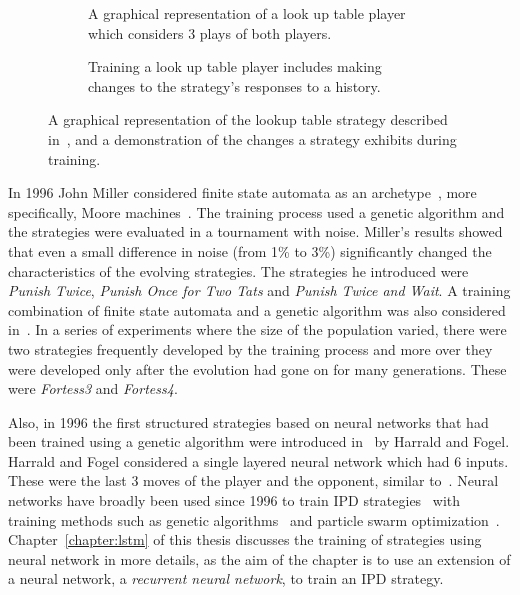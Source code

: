 \begin{figure}[!hbtp]
    \begin{subfigure}{.45\textwidth}\centering
        
        \caption{A graphical representation of a look up table player which considers
        3 plays of both players.}\label{fig:lookup_table_diagram}
    \end{subfigure}\hspace{.5cm}
    \begin{subfigure}{.45\textwidth}\centering
        
        \caption{Training a look up table player includes making changes to the
        strategy's responses to a history.}\label{fig:lookup_table_diagram_choice}
     \end{subfigure}
     \caption{A graphical representation of the lookup table strategy described
     in~\cite{Axelrod1987}, and a demonstration of the changes a strategy exhibits
     during training.}\label{fig:lookup_table}
\end{figure}

In 1996 John Miller considered finite state automata as an
archetype~\cite{Miller1996}, more specifically, Moore
machines~\cite{moore1956}. The training process used a genetic algorithm and
the strategies were evaluated in a tournament with noise.
Miller's results showed that even a small
difference in noise (from 1\% to 3\%) significantly changed the characteristics
of the evolving strategies. The strategies he introduced were \textit{Punish
Twice}, \textit{Punish Once for Two Tats} and \textit{Punish Twice and Wait}.
A training combination of finite state automata and a genetic algorithm was
also considered in~\cite{Ashlock2006b}. In a series of experiments where the size of
the population varied, there were two strategies frequently developed by the
training process and more over they were developed only after the evolution had
gone on for many generations. These were \textit{Fortess3} and
\textit{Fortess4}.

Also, in 1996 the first structured strategies based on
neural networks that had been trained using a genetic algorithm were introduced
in~\cite{Harrald1996} by Harrald and Fogel. Harrald and Fogel considered a
single layered neural network which had 6 inputs. These were the last 3 moves of
the player and the opponent, similar to~\cite{Axelrod1987}. Neural networks have
broadly been used since 1996 to train IPD strategies~\cite{Ashlock2006a, Chong2005,
Marks1999, Franken2005} with training methods such as genetic
algorithms~\cite{Ashlock2006a, Chong2005, Marks1999, Franken2005} and particle swarm
optimization~\cite{Franken2005}. Chapter~\ref{chapter:lstm} of this thesis discusses
the training of strategies using neural network in more details, as the aim of
the chapter is to use an extension of a neural network, a
\textit{recurrent neural network}, to train an IPD strategy.

